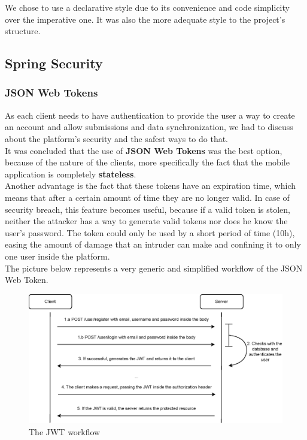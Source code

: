 We chose to use a declarative style due to its convenience and code simplicity
over the imperative one. It was also the more adequate style to the project's structure. 

\subsection{Spring Security}

\subsubsection{JSON Web Tokens}

As each client needs to have authentication to provide the user a way to create an account and allow submissions and data synchronization,
we had to discuss about the platform's security and the safest ways to do that.\\

It was concluded that the use of \textbf{JSON Web Tokens}\cite{jwt} was the best option, because of the nature of the clients, more specifically the fact that
the mobile application is completely \textbf{stateless}.\\

Another advantage is the fact that these tokens have an expiration time, which means that after a certain amount of time they are no longer valid.
In case of security breach, this feature becomes useful, because if a valid token is stolen, neither the attacker has a way to generate valid tokens 
nor does he know the user's password. The token could only be used by a short period of time (10h), easing the amount of damage that an intruder can
make and confining it to only one user inside the platform.\\

The picture below represents a very generic and simplified workflow of the JSON Web Token. 

\begin{figure}[H]
    \begin{center}
        \includegraphics[scale=0.9]{_figures/JWT-simple-diagram.eps}
        \caption{The JWT workflow}
    \end{center}
\end{figure}

